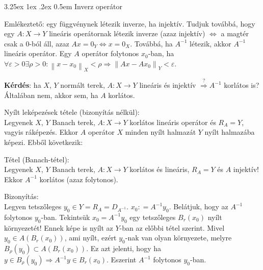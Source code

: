 \documentclass[12pt,a4paper]{scrartcl}
\makeatletter
\renewcommand\paragraph{\@startsection{paragraph}{4}{\z@}%
                                    {3.25ex \@plus1ex \@minus.2ex}%
                                    {0.5em} %
                                    {\normalfont\normalsize\bfseries}}
\newenvironment{tetel}{}{}
\newenvironment{bizonyitas}{}{}
\makeatother
\begin{document}
\hypertarget{inverz-operator}{%
\paragraph{Inverz operátor}\label{inverz-operator}}

Emlékeztető: egy függvénynek létezik inverze, ha injektív. Tudjuk
továbbá, hogy egy \(\left. A:X\rightarrow Y \right.\) lineáris
operátornak létezik inverze (azaz injektív) \(\Leftrightarrow\) a magtér
csak a 0-ból áll, azaz
\(\left. Ax = 0_{Y}\Leftrightarrow x = 0_{X} \right.\). Továbbá, ha
\(A^{- 1}\) létezik, akkor \(A^{- 1}\) lineáris operátor. Egy \(A\)
operátor folytonos \(x_{0}\)-ban, ha
\(\left. \forall\varepsilon > 0\exists\rho > 0:\left\| {x - x_{0}} \right\|_{X} < \rho\Rightarrow\left\| {Ax - Ax_{0}} \right\|_{Y} < \varepsilon \right.\).

\textbf{Kérdés}: ha \(X\), \(Y\) normált terek,
\(\left. A:X\rightarrow Y \right.\) lineáris és injektív
\(\overset{?}{\Rightarrow}A^{- 1}\) korlátos is? Általában nem, akkor
sem, ha \(A\) korlátos.

\begin{tetel}

Nyílt leképezések tétele (bizonyítás nélkül):\\
Legyenek \(X\), \(Y\) Banach terek, \(\left. A:X\rightarrow Y \right.\)
korlátos lineáris operátor és \(R_{A} = Y\), vagyis ráképezés. Ekkor
\(A\) operátor \(X\) minden nyílt halmazát \(Y\) nyílt halmazába képezi.
Ebből következik:

\end{tetel}

\begin{tetel}

Tétel (Banach-tétel):\\
Legyenek \(X\), \(Y\) Banach terek, \(\left. A:X\rightarrow Y \right.\)
korlátos és lineáris, \(R_{A} = Y\) és \(A\) injektív! Ekkor \(A^{- 1}\)
korlátos (azaz folytonos).

\end{tetel}

\begin{bizonyitas}

Bizonyítás:\\
Legyen tetszőleges \(y_{0} \in Y = R_{A} = D_{A^{- 1}}\).
\(x_{0}: = A^{- 1}y_{0}\). Belátjuk, hogy az \(A^{- 1}\) folytonos
\(y_{0}\)-ban. Tekintsük \(x_{0} = A^{- 1}y_{0}\) egy tetszőleges
\(B_{r}\left( x_{0} \right)\) nyílt környezetét! Ennek képe is nyílt az
\(Y\)-ban az előbbi tétel szerint. Mivel
\(y_{0} \in A\left( {B_{r}\left( x_{0} \right)} \right)\), ami nyílt,
ezért \(y_{0}\)-nak van olyan környezete, melyre
\(B_{\rho}\left( y_{0} \right) \subset A\left( {B_{r}\left( x_{0} \right)} \right)\).
Ez azt jelenti, hogy ha
\(\left. y \in B_{\rho}\left( y_{0} \right)\Rightarrow A^{- 1}y \in B_{r}\left( x_{0} \right) \right.\).
Eszerint \(A^{- 1}\) folytonos \(y_{0}\)-ban.

\end{bizonyitas}
\end{document}
